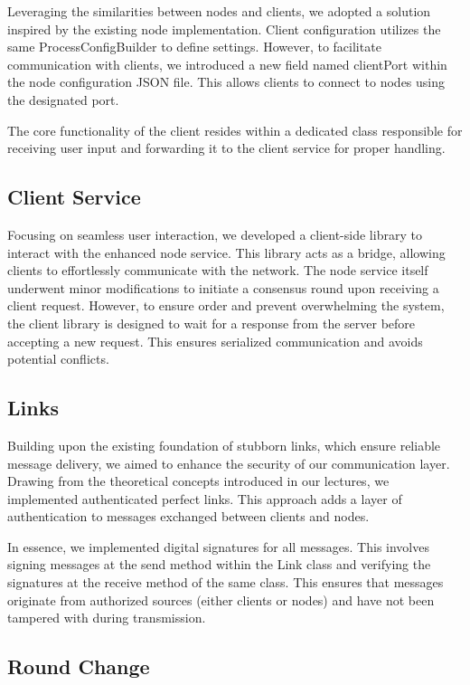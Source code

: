 \documentclass[12pt]{article}
\begin{document}
Leveraging the similarities between nodes and clients, we adopted a solution inspired by the existing node implementation.  Client configuration utilizes the same ProcessConfigBuilder to define settings.  However, to facilitate communication with clients, we introduced a new field named clientPort within the node configuration JSON file. This allows clients to connect to nodes using the designated port.

The core functionality of the client resides within a dedicated class responsible for receiving user input and forwarding it to the client service for proper handling.

\subsection{Client Service}

Focusing on seamless user interaction, we developed a client-side library to interact with the enhanced node service. This library acts as a bridge, allowing clients to effortlessly communicate with the network.  The node service itself underwent minor modifications to initiate a consensus round upon receiving a client request.  However, to ensure order and prevent overwhelming the system, the client library is designed to wait for a response from the server before accepting a new request. This ensures serialized communication and avoids potential conflicts.

\subsection{Links}
Building upon the existing foundation of stubborn links, which ensure reliable message delivery, we aimed to enhance the security of our communication layer. Drawing from the theoretical concepts introduced in our lectures, we implemented authenticated perfect links. This approach adds a layer of authentication to messages exchanged between clients and nodes.

In essence, we implemented digital signatures for all messages. This involves signing messages at the send method within the Link class and verifying the signatures at the receive method of the same class. This ensures that messages originate from authorized sources (either clients or nodes) and have not been tampered with during transmission.

\subsection{Round Change}
\end{document}
